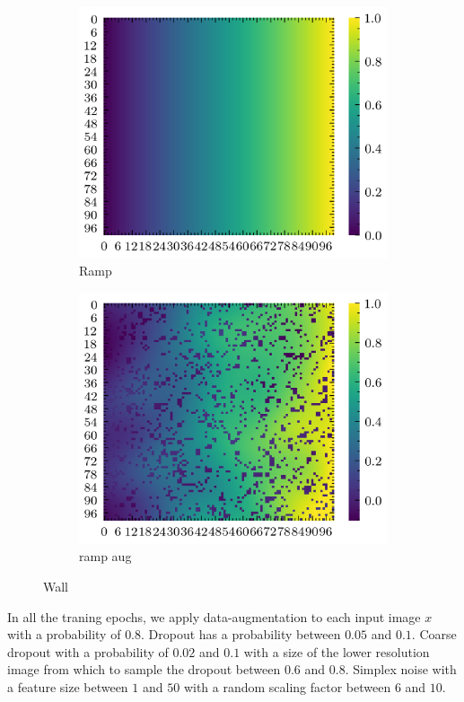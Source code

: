 \documentclass[../document.tex]{subfiles}
\begin{document}
\begin{figure}[H]
\begin{subfigure}[b]{0.45\textwidth}
            \includegraphics[width=\textwidth]{../img/data-aug/2d/ramp.png}
            \caption{Ramp}
        \end{subfigure}
        \begin{subfigure}[b]{0.45\linewidth}
            \includegraphics[width=\textwidth]{../img/data-aug/2d/ramp-aug.png}
            \caption{ramp aug}
        \end{subfigure}    
    \label{fig: others-aug}
    \caption{Wall}    
\end{figure}
In all the traning epochs, we apply data-augmentation to each input image $x$ with a probability of $0.8$. Dropout has a probability between $0.05$ and $0.1$. Coarse dropout with a probability of $0.02$ and $0.1$ with a size of the lower resolution image from which to sample the dropout between $0.6$ and $0.8$. Simplex noise with a feature size between $1$ and $50$ with a random scaling factor between $6$ and $10$. 
\end{document}
